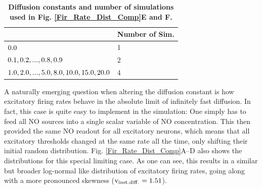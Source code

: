 \documentclass[10pt,letterpaper]{article}
\begin{document}
\begin{table}
\caption{\bf Diffusion constants and number of simulations used in Fig. \ref{Fir_Rate_Dist_Comp}E and F.}
\begin{tabu}{|l|l|}
\hline
{} & \textbf{Number of Sim.} \\ \hline
$\rm 0.0$ & 1 \\ \hline
$\rm 0.1,0.2,...,0.8,0.9$ & 2 \\ \hline
$\rm 1.0,2.0,...,5.0,8.0,10.0,15.0,20.0$ & 4 \\ \hline
\end{tabu}
\label{Diff_Test_Constants_Sim_Number}
\end{table}

A naturally emerging question when altering the diffusion constant is how excitatory firing rates behave in the absolute limit of infinitely fast diffusion. In fact, this case is quite easy to implement in the simulation: One simply has to feed all NO sources into a single scalar variable of NO concentration. This then provided the same NO readout for all excitatory neurons, which means that all excitatory thresholds changed at the same rate all the time, only shifting their initial random distribution. Fig. \ref{Fir_Rate_Dist_Comp}A--D also shows the distributions for this special limiting case. As one can see, this results in a similar but broader log-normal like distribution of excitatory firing rates, going along with a more pronounced skewness ($\mathrm{v_{\rm inst. diff.} = 1.51}$). 
\end{document}

